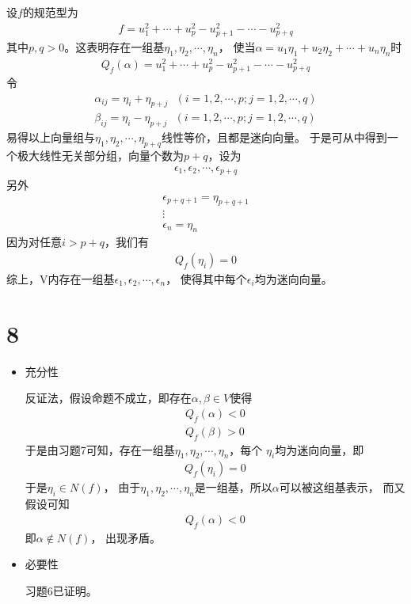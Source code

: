 \documentclass{article}
\begin{document}
设$f$的规范型为
\begin{align*}
  f = u_1^2 + \cdots + u_p^2 - u_{p+1}^2 - \cdots - u_{p + q}^2
\end{align*}
其中$p, q > 0$。这表明存在一组基$\eta_1, \eta_2, \cdots, \eta_n$，
使当$\alpha = u_1 \eta_1 + u_2 \eta_2 + \cdots + u_n \eta_n$时
\begin{align*}
  Q_f(\alpha) = u_1^2 + \cdots + u_p^2 - u_{p+1}^2 - \cdots - u_{p + q}^2
\end{align*}
令
\begin{align*}
  \alpha_{ij} = \eta_i + \eta_{p + j} \ \ \ (i=1,2, \cdots, p; j = 1,2, \cdots, q) \\
  \beta_{ij} = \eta_i - \eta_{p + j} \ \ \ (i=1,2, \cdots, p; j = 1,2, \cdots, q)
\end{align*}
易得以上向量组与$\eta_1, \eta_2, \cdots, \eta_{p + q}$线性等价，且都是迷向向量。
于是可从中得到一个极大线性无关部分组，向量个数为$p + q$，设为
\begin{align*}
  \epsilon_1, \epsilon_2, \cdots, \epsilon_{p + q}
\end{align*}
另外
\begin{align*}
  \epsilon_{p + q + 1} = \eta_{p + q + 1} \\
  \vdots                                  \\
  \epsilon_n = \eta_n
\end{align*}
因为对任意$i > p+q$，我们有
\begin{align*}
  Q_f(\eta_i) = 0
\end{align*}
综上，V内存在一组基$\epsilon_1, \epsilon_2, \cdots, \epsilon_n$，
使得其中每个$\epsilon_i$均为迷向向量。

\section*{8}

\begin{itemize}
  \item 充分性

        反证法，假设命题不成立，即存在$\alpha, \beta \in V$使得
        \begin{align*}
          Q_f(\alpha) < 0 \\
          Q_f(\beta) > 0
        \end{align*}
        于是由习题7可知，存在一组基$\eta_1, \eta_2, \cdots, \eta_n$，每个
        $\eta_i$均为迷向向量，即
        \begin{align*}
          Q_f(\eta_i) = 0
        \end{align*}
        于是$\eta_i \in N(f)$，
        由于$\eta_1, \eta_2, \cdots, \eta_n$是一组基，所以$\alpha$可以被这组基表示，
        而又假设可知
        \begin{align*}
          Q_f(\alpha) < 0
        \end{align*}
        即$\alpha \not \in N(f)$，
        出现矛盾。

  \item 必要性

        习题6已证明。
\end{itemize}
\end{document}
